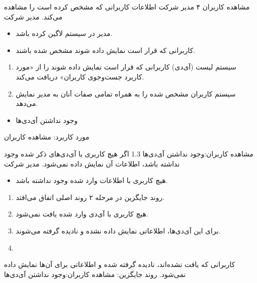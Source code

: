 {
\usecase
{مشاهده کاربران}
{۴}
{مدیر شرکت اطلاعات کاربرانی که مشخص کرده است را مشاهده می‌کند.}
{مدیر شرکت}
{}
{
		\begin{itemize}
		\item
		مدیر در سیستم لاگین کرده باشد.
		
		\item
		‌کاربرانی که قرار است نمایش داده شوند مشخص شده باشند.
	\end{itemize}
}
{
\begin{enumerate}
	\item 
	سیستم لیست (آی‌دی) کاربرانی که قرار است نمایش داده شوند را از «مورد کاربرد جست‌وجوی کاربران» دریافت می‌کند.
	
	\item
	سیستم کاربران مشخص شده را به همراه تمامی صفات آنان به مدیر نمایش می‌دهد.
\end{enumerate}
}
{
}
{
	\begin{itemize}
		\item 
		وجود نداشتن آی‌دی‌ها
	\end{itemize}
}
{مورد کاربرد: مشاهده کاربران}

\alternativeflow
{
	مشاهده کاربران:وجود‌ نداشتن آی‌دی‌ها
}
{1.3}
{
	اگر هیچ کاربری با آی‌دی‌های ذکر شده وجود نداشته باشد، اطلاعات آن نمایش داده نمی‌شود.
}
{
	مدیر شرکت
}
{}
{
	\begin{itemize}
		
		\item
		هیچ کاربری با اطلاعات وارد شده وجود نداشته باشد.
	\end{itemize}
}
{
	\vspace*{-0.6cm}
	\begin{enumerate}
		\item 
		روند جایگزین در مرحله ۲ روند اصلی اتفاق می‌افتد.
		\item
		هیچ کاربری با آی‌دی‌ وارد شده یافت نمی‌شود.
		\item 
		برای این آی‌دی‌ها، اطلاعاتی نمایش داده نشده و نادیده گرفته می‌شوند.
		\item
	\end{enumerate}
}
{
	کاربرانی که یافت نشده‌اند، نادیده گرفته شده و اطلاعاتی برای آن‌ها نمایش داده نمی‌شود.
}
{
	روند جایگزین:  مشاهده کاربران:وجود نداشتن آی‌دی‌ها
}
}


